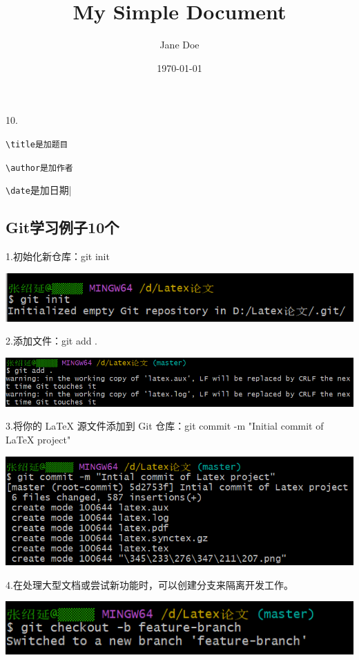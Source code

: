 \documentclass{article}
\begin{document}
10.
\title{My Simple Document} \verb|\title是加题目|

\author{Jane Doe}\verb|\author是加作者|

\date{\today}\verb|\date|是加日期|




\subsection{Git学习例子10个}
1.初始化新仓库：git init

\noindent
\begin{minipage}{\linewidth}
  \centering
  \includegraphics[width=0.5\linewidth]{git1.png}
  \label{fig:example}
\end{minipage}


2.添加文件：git add .


\noindent
\begin{minipage}{\linewidth}
  \centering
  \includegraphics[width=0.5\linewidth]{git2.png}
  \label{fig:example}
\end{minipage}

3.将你的 LaTeX 源文件添加到 Git 仓库：git commit -m "Initial commit of LaTeX project"

\noindent
\begin{minipage}{\linewidth}
  \centering
  \includegraphics[width=0.5\linewidth]{git3.png}
  \label{fig:example}
\end{minipage}

4.在处理大型文档或尝试新功能时，可以创建分支来隔离开发工作。

\noindent
\begin{minipage}{\linewidth}
 \centering
  \includegraphics[width=0.5\linewidth]{git4.png}
  \label{fig:example}
\end{minipage}
\end{document}
